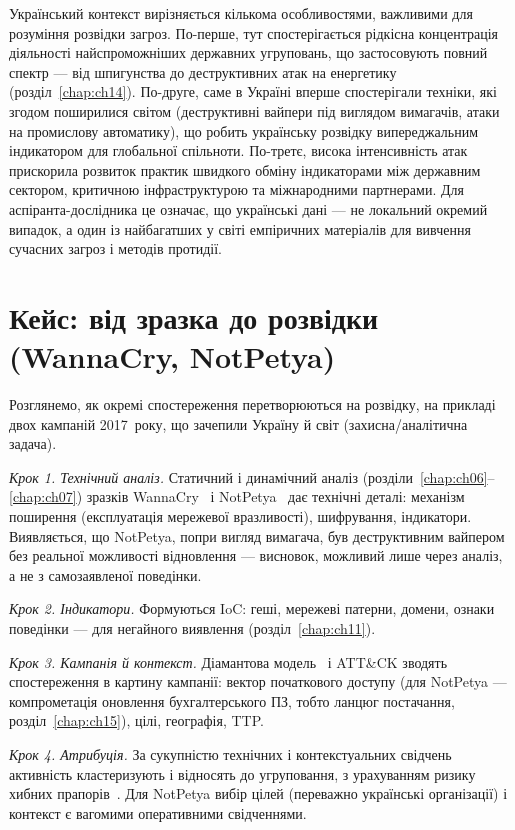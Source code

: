 Український контекст вирізняється кількома особливостями, важливими для розуміння розвідки загроз. По-перше, тут спостерігається рідкісна концентрація діяльності найспроможніших державних угруповань, що застосовують повний спектр --- від шпигунства до деструктивних атак на енергетику (розділ~\ref{chap:ch14}). По-друге, саме в Україні вперше спостерігали техніки, які згодом поширилися світом (деструктивні вайпери під виглядом вимагачів, атаки на промислову автоматику), що робить українську розвідку випереджальним індикатором для глобальної спільноти. По-третє, висока інтенсивність атак прискорила розвиток практик швидкого обміну індикаторами між державним сектором, критичною інфраструктурою та міжнародними партнерами. Для аспіранта-дослідника це означає, що українські дані --- не локальний окремий випадок, а один із найбагатших у світі емпіричних матеріалів для вивчення сучасних загроз і методів протидії.

\section{Кейс: від зразка до розвідки (WannaCry, NotPetya)}\label{sec:ch12-case}

Розглянемо, як окремі спостереження перетворюються на розвідку, на прикладі двох кампаній 2017~року, що зачепили Україну й світ (захисна/аналітична задача).

\emph{Крок 1. Технічний аналіз.} Статичний і динамічний аналіз (розділи~\ref{chap:ch06}--\ref{chap:ch07}) зразків WannaCry~\cite{ch12:wannacry} і NotPetya~\cite{ch01:greenberg} дає технічні деталі: механізм поширення (експлуатація мережевої вразливості), шифрування, індикатори. Виявляється, що NotPetya, попри вигляд вимагача, був деструктивним вайпером без реальної можливості відновлення --- висновок, можливий лише через аналіз, а не з самозаявленої поведінки.

\emph{Крок 2. Індикатори.} Формуються IoC: геші, мережеві патерни, домени, ознаки поведінки --- для негайного виявлення (розділ~\ref{chap:ch11}).

\emph{Крок 3. Кампанія й контекст.} Діамантова модель~\cite{ch12:diamond} і ATT\&CK зводять спостереження в картину кампанії: вектор початкового доступу (для NotPetya --- компрометація оновлення бухгалтерського ПЗ, тобто ланцюг постачання, розділ~\ref{chap:ch15}), цілі, географія, TTP.

\emph{Крок 4. Атрибуція.} За сукупністю технічних і контекстуальних свідчень активність кластеризують і відносять до угруповання, з урахуванням ризику хибних прапорів~\cite{ch12:attribution}. Для NotPetya вибір цілей (переважно українські організації) і контекст є вагомими оперативними свідченнями.

